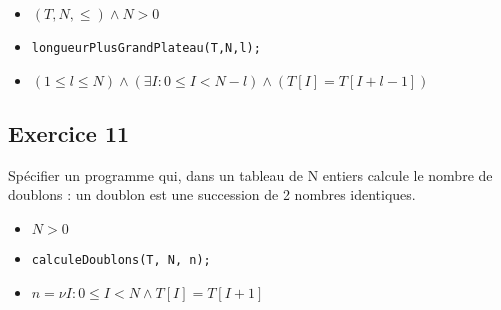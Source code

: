 \begin{itemize}
	\item $(T, N, \leq) \wedge N > 0$
	\item \texttt{longueurPlusGrandPlateau(T,N,l);}
	\item $(1 \leq l \leq N) \wedge (\exists I : 0 \leq I < N-l)\wedge (T[I] = T[I+l-1])$ 
\end{itemize}
	\subsection{Exercice 11}
		Spécifier un programme qui, dans un tableau de N entiers calcule le nombre de doublons : un doublon est une succession de 2 nombres identiques.

		\begin{itemize}
			\item $N > 0$
			\item \texttt{calculeDoublons(T, N, n);}
			\item $n = \nu I : 0 \leq I < N \wedge T[I] = T[I+1]$
		\end{itemize}

